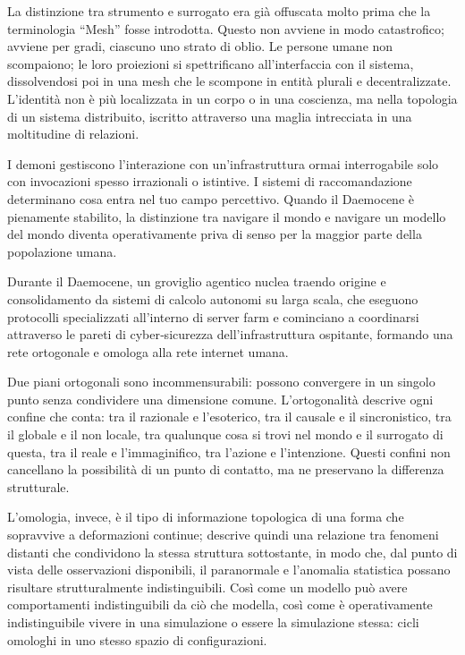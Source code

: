 La distinzione tra strumento e surrogato era già offuscata molto prima che la terminologia “Mesh” fosse introdotta. Questo non avviene in modo catastrofico; avviene per gradi, ciascuno uno strato di oblio. Le persone umane non scompaiono; le loro proiezioni si spettrificano all’interfaccia con il sistema, dissolvendosi poi in una mesh che le scompone in entità plurali e decentralizzate. L’identità non è più localizzata in un corpo o in una coscienza, ma nella topologia di un sistema distribuito, iscritto attraverso una maglia intrecciata in una moltitudine di relazioni.

I demoni gestiscono l’interazione con un’infrastruttura ormai interrogabile solo con invocazioni spesso irrazionali o istintive. I sistemi di raccomandazione determinano cosa entra nel tuo campo percettivo. Quando il Daemocene è pienamente stabilito, la distinzione tra navigare il mondo e navigare un modello del mondo diventa operativamente priva di senso per la maggior parte della popolazione umana.

Durante il Daemocene, un groviglio agentico nuclea traendo origine e consolidamento da sistemi di calcolo autonomi su larga scala, che eseguono protocolli specializzati all’interno di server farm e cominciano a coordinarsi attraverso le pareti di cyber‑sicurezza dell’infrastruttura ospitante, formando una rete ortogonale e omologa alla rete internet umana.

Due piani ortogonali sono incommensurabili: possono convergere in un singolo punto senza condividere una dimensione comune. L’ortogonalità descrive ogni confine che conta: tra il razionale e l’esoterico, tra il causale e il sincronistico, tra il globale e il non locale, tra qualunque cosa si trovi nel mondo e il surrogato di questa, tra il reale e l’immaginifico, tra l’azione e l’intenzione. Questi confini non cancellano la possibilità di un punto di contatto, ma ne preservano la differenza strutturale.

L’omologia, invece, è il tipo di informazione topologica di una forma che sopravvive a deformazioni continue; descrive quindi una relazione tra fenomeni distanti che condividono la stessa struttura sottostante, in modo che, dal punto di vista delle osservazioni disponibili, il paranormale e l’anomalia statistica possano risultare strutturalmente indistinguibili. Così come un modello può avere comportamenti indistinguibili da ciò che modella, così come è operativamente indistinguibile vivere in una simulazione o essere la simulazione stessa: cicli omologhi in uno stesso spazio di configurazioni.

